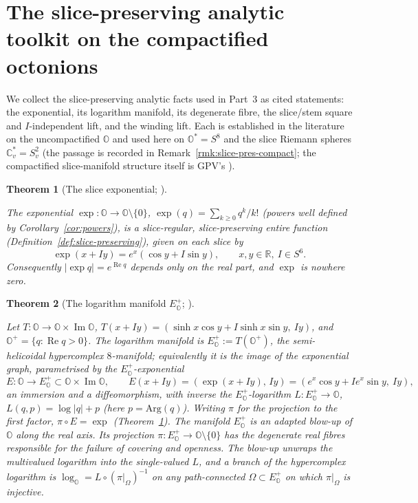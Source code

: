 \documentclass[11pt]{article}
\newcommand{\OO}{\mathbb{O}}
\newcommand{\CC}{\mathbb{C}}
\newcommand{\RR}{\mathbb{R}}
\newcommand{\Ostar}{\OO^{*}}
\DeclareMathOperator{\re}{Re}
\DeclareMathOperator{\im}{Im}
\providecommand{\lean}[1]{}
\providecommand{\uses}[1]{}
\theoremstyle{plain}
\newtheorem{theorem}{Theorem}[section]
\theoremstyle{definition}
\theoremstyle{remark}
\begin{document}
\section{The slice-preserving analytic toolkit on the compactified octonions}\label{sec:toolkit}

We collect the slice-preserving analytic facts used in Part~3 as cited statements: the exponential,
its logarithm manifold, its degenerate fibre, the slice/stem square and $I$-independent lift, and the
winding lift. Each is established in the literature on the uncompactified $\OO$ and used here on
$\Ostar=S^8$ and the slice Riemann spheres $\CC_v^{*}=S^2_v$ (the passage is recorded in
Remark~\ref{rmk:slice-pres-compact}; the compactified slice-manifold structure itself is GPV's \cite{VS}).

\begin{theorem}[The slice exponential; ]\label{thm:slice-exp}
\lean{Octonion.exp, Octonion.exp_sliceEmbed, Octonion.norm_exp,
Octonion.exp_ne_zero}
\uses{def:slice-preserving, cor:powers}
The exponential $\exp:\OO\to\OO\setminus\{0\}$, $\exp(q)=\sum_{k\ge0}q^{k}/k!$ (powers well defined by Corollary~\ref{cor:powers}), is a
slice-regular, slice-preserving entire function (Definition~\ref{def:slice-preserving}),
given on each slice by
\[
\exp(x+Iy)=e^{x}(\cos y+I\sin y),\qquad x,y\in\RR,\ I\in S^6 .
\]
Consequently $|\exp q|=e^{\re q}$ depends only on the real part, and $\exp$ is nowhere zero.
\end{theorem}

\begin{theorem}[The logarithm manifold $E^{+}_{\OO}$; ]\label{thm:log-manifold}
\lean{Octonion.Eexp, Octonion.logManifold, Octonion.Llog,
Octonion.Llog_Eexp, Octonion.Eexp_Llog, Octonion.exp_Llog}
\uses{thm:slice-exp}
Let $T:\OO\to\OO\times\im\OO$, $T(x+Iy)=(\sinh x\cos y+I\sinh x\sin y,\ Iy)$, and
$\OO^{+}=\{q:\re q>0\}$. The \emph{logarithm manifold} is $E^{+}_{\OO}:=T(\OO^{+})$, the
semi-helicoidal hypercomplex $8$-manifold; equivalently it is the image of the exponential
graph, parametrised by the \emph{$E^{+}_{\OO}$-exponential}
\[
E:\OO\longrightarrow E^{+}_{\OO}\subset\OO\times\im\OO,\qquad
E(x+Iy)=(\exp(x+Iy),\,Iy)=(e^{x}\cos y+Ie^{x}\sin y,\ Iy),
\]
an immersion and a diffeomorphism, with inverse the \emph{$E^{+}_{\OO}$-logarithm}
$L:E^{+}_{\OO}\to\OO$, $L(q,p)=\log|q|+p$ (here $p=\mathrm{Arg}(q)$). Writing $\pi$ for the
projection to the first factor, $\pi\circ E=\exp$ (Theorem~\ref{thm:slice-exp}). The manifold
$E^{+}_{\OO}$ is an adapted blow-up of $\OO$ along the real axis. Its projection
$\pi:E^{+}_{\OO}\to\OO\setminus\{0\}$ has the degenerate real fibres responsible for the
failure of covering and openness. The blow-up unwraps the multivalued logarithm into the
single-valued $L$, and a branch of the
hypercomplex logarithm is $\log_{\OO}=L\circ(\pi|_{\Omega})^{-1}$ on any path-connected
$\Omega\subset E^{+}_{\OO}$ on which $\pi|_{\Omega}$ is injective.
\end{theorem}
\end{document}
